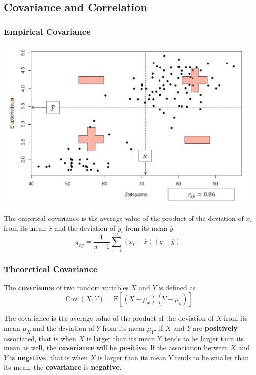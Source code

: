 \documentclass[11pt]{article}
\newcommand*\samplemean[1]{\overline{#1}}
\newcommand*\ev[1]{\mathrel{\text{E}\left[#1\right]}}
\newcommand*\Cov[1]{\mathop{\text{Cov}}\left(#1\right)}
\begin{document}
\subsection{Covariance and Correlation}

\subsubsection{Empirical Covariance}
\begin{minipage}{0.4\linewidth}
	\begin{center}
		\includegraphics[width=0.9\linewidth]{img/empirical_covariance}
	\end{center}
\end{minipage}
\begin{minipage}{0.6\linewidth}
	The empirical covariance is the average value of the product of the deviation of $x_i$ from its mean $\samplemean{x}$ and the deviation of $y_i$ from its mean $\samplemean{y}$
	\begin{equation*}
		q_{xy} = \frac{1}{n-1}\sum_{i=1}^{n}(x_i - \samplemean{x} )(y-\samplemean{y})
	\end{equation*}
\end{minipage}

\subsubsection{Theoretical Covariance}
\begin{definition}
	The \textbf{covariance} of two random variables $X$ and $Y$ is defined as
	\begin{equation*}
		\Cov{X,Y} = \ev{(X-\mu_x)(Y-\mu_y)}
	\end{equation*}
\end{definition}
The covariance is the average value of the product of the deviation of $X$ from its mean $\mu_X$ and the deviation of $Y$ from its mean $\mu_Y$. If $X$ and $Y$ are \textbf{positively} associated, that is when $X$ is larger than its mean Y tends to be larger than its mean as well, the \textbf{covariance} will be \textbf{positive}. If the association between $X$ and $Y$ is \textbf{negative}, that is when $X$ is larger than its mean $Y$ tends to be smaller than its mean, the \textbf{covariance} is \textbf{negative}.
\end{document}
